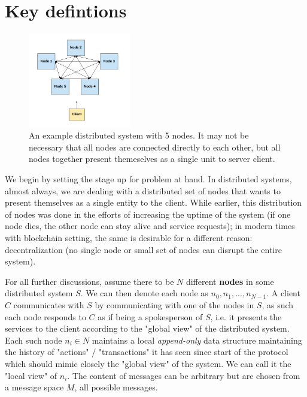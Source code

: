 \section{Key defintions}

\begin{figure}
    \centering
    \includegraphics[width=0.40\textwidth]{time-synchrony-failures/key-definitions/assets/5-node-distributed-system.png}
    \caption{An example distributed system with 5 nodes. It may not be necessary that all nodes are connected directly to each other, but all nodes together present themeselves as a single unit to server client.}
    \label{fig:five-node-distributed-system}
\end{figure}

We begin by setting the stage up for problem at hand. In distributed systems, almost always, we are dealing with a distributed set of nodes that wants to present themselves as a single entity to the client. While earlier, this distribution of nodes was done in the efforts of increasing the uptime of the system (if one node dies, the other node can stay alive and service requests); in modern times with blockchain setting, the same is desirable for a different reason: decentralization (no single node or small set of nodes can disrupt the entire system).

For all further discussions, assume there to be $N$ different \textbf{nodes} in some distributed system $S$. We can then denote each node as $n_0, n_1, ..., n_{N-1}$. A client $C$ communicates with $S$ by communicating with one of the nodes in $S$, as such each node responds to $C$ as if being a spokesperson of $S$, i.e. it presents the services to the client according to the "global view" of the distributed system. Each such node $n_i \in N$ maintains a local \emph{append-only} data structure maintaining the history of "actions" / "transactions" it has seen since start of the protocol which should mimic closely the "global view" of the system. We can call it the "local view" of $n_i$. The content of messages can be arbitrary but are chosen from a message space $M$, all possible messages.

